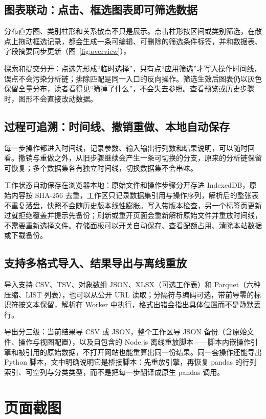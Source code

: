 \documentclass[UTF8,a4paper,11pt,fontset=fandol]{ctexart}
\begin{document}
\subsection{图表联动：点击、框选图表即可筛选数据}

分布直方图、类别柱形和关系散点不只是展示。点击柱形按区间或类别筛选，在散点上拖动框选记录，都会生成一条可编辑、可删除的筛选条件标签，并和数据表、字段摘要同步更新（图~\ref{fig:overview}）。

探索和提交分开：点选先形成“临时选择”，只有点“应用筛选”才写入操作时间线，误点不会污染分析链；排除匹配是同一入口的反向操作。筛选生效后图表仍以灰色保留全量分布，读者看得见“筛掉了什么”，不会失去参照。查看预览或历史步骤时，图形不会直接改动数据。

\subsection{过程可追溯：时间线、撤销重做、本地自动保存}

每一步操作都进入时间线，记录参数、输入输出行列数和结果说明，可以随时回看。撤销与重做之外，从旧步骤继续会产生一条可切换的分支，原来的分析链保留可恢复；多个数据集各有独立时间线，切换数据集不会串味。

工作状态自动保存在浏览器本地：原始文件和操作步骤分开存进 IndexedDB，原始内容按 SHA-256 去重，工作区只记录数据集引用与操作序列，解析后的整张表不重复落盘，快照不会随历史版本线性膨胀。写入带版本检查，另一个标签页更新过就拒绝覆盖并提示先备份；刷新或重开页面会重新解析原始文件并重放时间线，不需要重新选择文件。存储面板可以开关自动保存、查看配额占用、清除本站数据或下载备份。

\subsection{支持多格式导入、结果导出与离线重放}

导入支持 CSV、TSV、对象数组 JSON、XLSX（可选工作表）和 Parquet（六种压缩、LIST 列表），也可以从公开 URL 读取；分隔符与编码可选，带前导零的标识符按文本保留，解析在 Worker 中执行，格式出错会指出具体位置而不是静默丢行。

导出分三级：当前结果导 CSV 或 JSON，整个工作区导 JSON 备份（含原始文件、操作与视图配置），以及自包含的 Node.js 离线重放脚本——脚本内嵌操作引擎和被引用的原始数据，不打开网站也能重算出同一份结果。同一套操作还能导出 Python 脚本，文中明确说明它是桥接脚本：先重放引擎，再恢复 pandas 的行列索引、可空列与分类类型，而不是把每一步翻译成原生 pandas 调用。

\section{页面截图}
\end{document}
